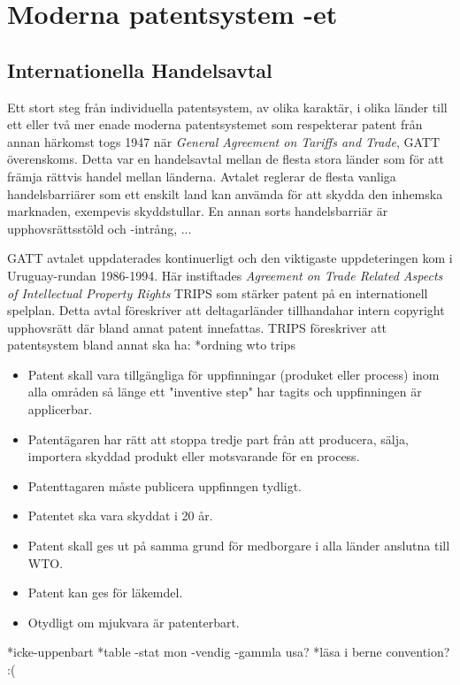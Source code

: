 \section{Moderna patentsystem -et}

\subsection{Internationella Handelsavtal}
Ett stort steg från individuella patentsystem, av olika karaktär, i olika länder till ett eller två mer enade moderna patentsystemet som respekterar patent från annan härkomst togs 1947 när \emph{General Agreement on Tariffs and Trade}, GATT överenskoms. Detta var en handelsavtal mellan de flesta stora länder som för att främja rättvis handel mellan länderna. \cite{gatt} Avtalet reglerar de flesta vanliga handelsbarriärer som ett enskilt land kan anvämda för att skydda den inhemska marknaden, exempevis skyddstullar. En annan sorts handelsbarriär är upphovsrättsstöld och -intrång, ...

GATT avtalet uppdaterades kontinuerligt och den viktigaste uppdeteringen kom i Uruguay-rundan 1986-1994. Här instiftades \emph{Agreement on Trade Related Aspects of Intellectual Property Rights} TRIPS som stärker patent på en internationell spelplan. Detta avtal föreskriver att deltagarländer tillhandahar intern copyright upphovsrätt där bland annat patent innefattas. TRIPS föreskriver att patentsystem bland annat ska ha:
*ordning wto trips

\begin{itemize}
	\item Patent skall vara tillgängliga för uppfinningar (produket eller process) inom alla områden så länge ett "inventive step" har tagits och uppfinningen är applicerbar.
	\item Patentägaren har rätt att stoppa tredje part från att producera, sälja, importera skyddad produkt eller motsvarande för en process.
	\item Patenttagaren måste publicera uppfinngen tydligt.
	\item Patentet ska vara skyddat i 20 år.
	\item Patent skall ges ut på samma grund för medborgare i alla länder anslutna till WTO.
	\item Patent kan ges för läkemdel.
	\item Otydligt om mjukvara är patenterbart.
\end{itemize}	
*icke-uppenbart
*table -stat mon -vendig -gammla usa? 
*läsa i berne convention? :(

